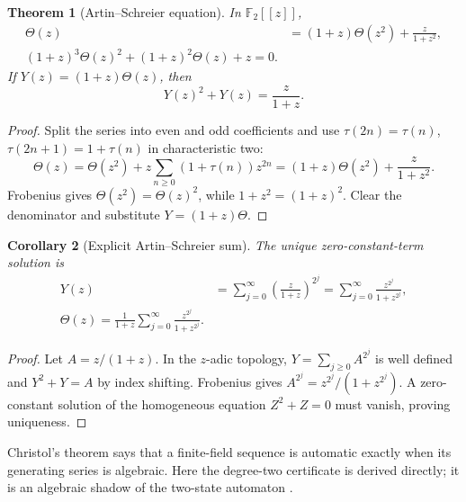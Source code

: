 \documentclass[11pt,oneside]{article}
\numberwithin{equation}{section}
\newtheorem{theorem}{Theorem}[section]
\newtheorem{corollary}[theorem]{Corollary}
\theoremstyle{definition}
\theoremstyle{remark}
\newcommand{\Ftwo}{\mathbb F_2}
\begin{document}
\begin{theorem}[Artin--Schreier equation]
\label{thm:Artin-Schreier}
In \(\Ftwo[[z]]\),
\begin{align}
  \Theta(z)&=(1+z)\Theta(z^2)+\frac{z}{1+z^2},
  \label{eq:Theta-functional}\\
  \boxed{
  (1+z)^3\Theta(z)^2+(1+z)^2\Theta(z)+z=0.}
  \label{eq:Theta-quadratic}
\end{align}
If \(Y(z)=(1+z)\Theta(z)\), then
\begin{equation}
  \boxed{
  Y(z)^2+Y(z)=\frac{z}{1+z}.}
  \label{eq:Y-Artin-Schreier}
\end{equation}
\end{theorem}

\begin{proof}
Split the series into even and odd coefficients and use
\(\tau(2n)=\tau(n)\), \(\tau(2n+1)=1+\tau(n)\) in characteristic two:
\[
 \Theta(z)=\Theta(z^2)+z\sum_{n\ge0}(1+\tau(n))z^{2n}
 =(1+z)\Theta(z^2)+\frac{z}{1+z^2}.
\]
Frobenius gives \(\Theta(z^2)=\Theta(z)^2\), while
\(1+z^2=(1+z)^2\).  Clear the denominator and substitute
\(Y=(1+z)\Theta\).
\end{proof}

\begin{corollary}[Explicit Artin--Schreier sum]
\label{cor:Artin-Schreier-sum}
The unique zero-constant-term solution is
\begin{align}
  Y(z)&=\sum_{j=0}^{\infty}
      \left(\frac{z}{1+z}\right)^{2^j}
      =\sum_{j=0}^{\infty}\frac{z^{2^j}}{1+z^{2^j}},
  \label{eq:Y-explicit}\\
  \boxed{
  \Theta(z)=\frac1{1+z}
      \sum_{j=0}^{\infty}\frac{z^{2^j}}{1+z^{2^j}}.}
  \label{eq:Theta-explicit}
\end{align}
\end{corollary}

\begin{proof}
Let \(A=z/(1+z)\).  In the \(z\)-adic topology,
\(Y=\sum_{j\ge0}A^{2^j}\) is well defined and
\(Y^2+Y=A\) by index shifting.  Frobenius gives
\(A^{2^j}=z^{2^j}/(1+z^{2^j})\).  A zero-constant solution of the homogeneous
equation \(Z^2+Z=0\) must vanish, proving uniqueness.
\end{proof}

Christol's theorem says that a finite-field sequence is automatic exactly when
its generating series is algebraic.  Here the degree-two certificate is
derived directly; it is an algebraic shadow of the two-state automaton
\cite{christol1980}.
\end{document}
